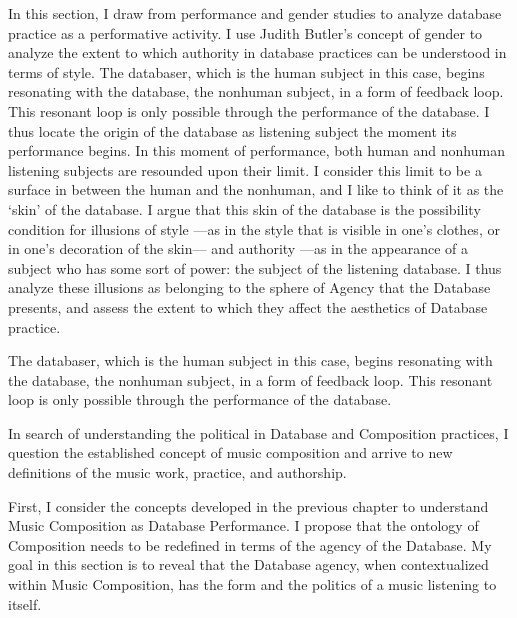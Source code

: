 In this section, I draw from performance and gender studies to analyze database practice as a performative activity. I use Judith Butler's concept of gender \parencite{But88:Per} to analyze the extent to which authority in database practices can be understood in terms of style.  The databaser, which is the human subject in this case, begins resonating with the database, the nonhuman subject, in a form of feedback loop. This resonant loop is only possible through the performance of the database. I thus locate the origin of the database as listening subject the moment its performance begins. In this moment of performance, both human and nonhuman listening subjects are resounded upon their limit. I consider this limit to be a surface in between the human and the nonhuman, and I like to think of it as the `skin' of the database. I argue that this skin of the database is the possibility condition for illusions of style ---as in the style that is visible in one's clothes, or in one's decoration of the skin--- and authority ---as in the appearance of a subject who has some sort of power: the subject of the listening database. I thus analyze these illusions as belonging to the sphere of Agency that the Database presents, and assess the extent to which they affect the aesthetics of Database practice.



The databaser, which is the human subject in this case, begins resonating with the database, the nonhuman subject, in a form of feedback loop. This resonant loop is only possible through the performance of the database. 






In search of understanding the political in Database and Composition practices, I question the established concept of music composition and arrive to new definitions of the music work, practice, and authorship. 

First, I consider the concepts developed in the previous chapter to understand Music Composition as Database Performance. I propose that the ontology of Composition needs to be redefined in terms of the agency of the Database. My goal in this section is to reveal that the Database agency, when contextualized within Music Composition, has the form and the politics of a music listening to itself. 

